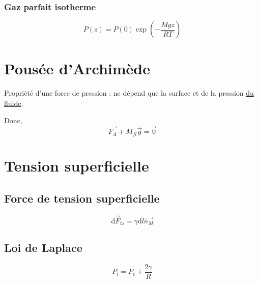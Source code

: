 \documentclass{report}
\begin{document}
\subsubsection{Gaz parfait isotherme} %

\begin{equation}
  P(z) = P(0) \exp \left( - \frac{Mgz}{RT}  \right)
\end{equation}


\section{Pousée d'Archimède} %
\label{sec:Pousée d'Archimède}

Propriété d'une force de pression : ne dépend que la surface et de la pression \underline{du fluide}.

Donc, 
\begin{equation}
  \overrightarrow{F_A} + M _{fl} \overrightarrow{g} = \overrightarrow{0}
\end{equation}

\section{Tension superficielle} %
\label{sec:Tension superficielle}

\subsection{Force de tension superficielle} %
\label{sub:Force de tension superficielle}
\begin{equation}
  \mathrm{d} \overrightarrow{F} _{ts} = \gamma \mathrm{d}l \overrightarrow{n_M}
\end{equation}

\subsection{Loi de Laplace} %
\label{sub:Loi de Laplace}

\begin{equation}
  P _{i}= P_e  + \frac{2 \gamma}{R} 
\end{equation}

\newpage
\end{document}
